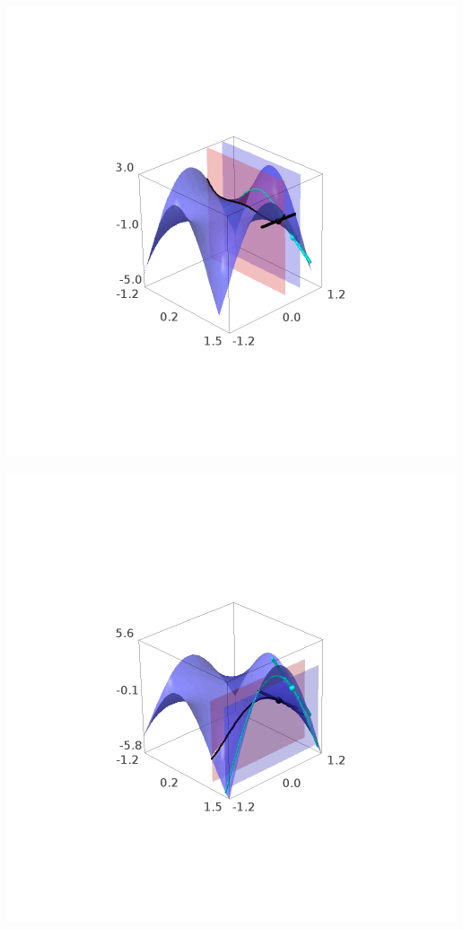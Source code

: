 \documentclass[../main.tex]{subfiles}
\begin{document}
\begin{solucao}
\begin{enumerate}[label=\arabic*.]
				\begin{center}
					\begin{minipage}{0.45\textwidth}
						\centering
						\includegraphics[width=\textwidth]{imagens/lista04/picture_lista04.02_q01_item10.01.png}
					\end{minipage}
					\hfill
					\begin{minipage}{0.45\textwidth}
						\centering
						\includegraphics[width=\textwidth]{imagens/lista04/picture_lista04.02_q01_item10.02.png}

\end{minipage}
\end{center}
\end{enumerate}
\end{solucao}
\end{document}
